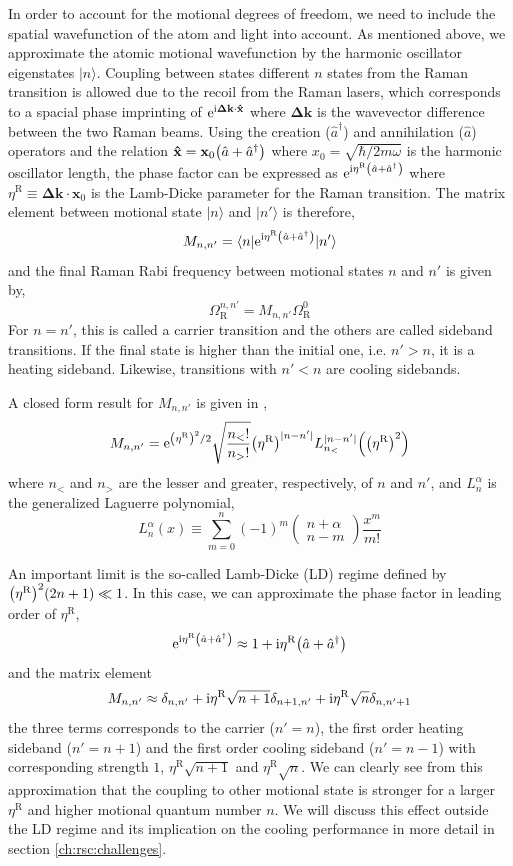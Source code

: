 In order to account for the motional degrees of freedom, we need to include the spatial
wavefunction of the atom and light into account.
As mentioned above, we approximate the atomic motional wavefunction by the harmonic oscillator
eigenstates $|n\rangle$. Coupling between states different $n$ states from the Raman transition
is allowed due to the recoil from the Raman lasers,
which corresponds to a spacial phase imprinting of $\mathrm{e}^{\mathrm{i}\mathbf{\Delta k}\cdot\mathbf{\hat x}}$
where $\mathbf{\Delta k}$ is the wavevector difference between the two Raman beams.
Using the creation ($\hat a^\dagger$) and annihilation ($\hat a$) operators and the relation
$\mathbf{\hat x}=\mathbf{x}_0{\left({\hat a+\hat a^\dagger}\right)}$ where $x_0=\sqrt{\hbar/2m\omega}$
is the harmonic oscillator length, the phase factor can be expressed as
$\mathrm{e}^{\mathrm{i}\eta^{\mathrm{R}}{\left({\hat a+\hat a^\dagger}\right)}}$ where $\eta^{\mathrm{R}}\equiv\mathbf{\Delta k}\cdot\mathbf{x}_0$
is the Lamb-Dicke parameter for the Raman transition.
The matrix element between motional state $|n\rangle$ and $|n'\rangle$ is therefore,
\[ M_{n,n'}=\langle n|\mathrm{e}^{\mathrm{i}\eta^{\mathrm{R}}{\left({\hat a+\hat a^\dagger}\right)}}|n'\rangle \]
and the final Raman Rabi frequency between motional states $n$ and $n'$ is given by,
\[ \Omega_{\mathrm{R}}^{n,n'}=M_{n,n'}\Omega_{\mathrm{R}}^0 \]
For $n=n'$, this is called a carrier transition and the others are called sideband transitions.
If the final state is higher than the initial one, i.e. $n'>n$, it is a heating sideband.
Likewise, transitions with $n'<n$ are cooling sidebands.

A closed form result for $M_{n,n'}$ is given in \cite{wineland_experimental_1998},
\[ M_{n,n'}=\mathrm{e}^{{\left({\eta^{\mathrm{R}}}\right)}^2/2}\sqrt{\frac{n_<!}{n_>!}}{\left({\eta^{\mathrm{R}}}\right)}^{|n-n'|}L_{n_<}^{|n-n'|}{\left({{\left({\eta^{\mathrm{R}}}\right)}^2}\right)} \]
where $n_<$ and $n_>$ are the lesser and greater, respectively, of $n$ and $n'$,
and $L_n^\alpha$ is the generalized Laguerre polynomial,
\[ L_n^\alpha(x)\equiv\sum_{m=0}^n(-1)^m\begin{pmatrix}n+\alpha\\n-m\end{pmatrix}\frac{x^m}{m!} \]

An important limit is the so-called Lamb-Dicke (LD) regime defined by ${\left({\eta^{\mathrm{R}}}\right)}^2(2n+1)\ll 1$.
In this case, we can approximate the phase factor in leading order of $\eta^{\mathrm{R}}$,
\[ \mathrm{e}^{\mathrm{i}\eta^{\mathrm{R}}{\left({\hat a+\hat a^\dagger}\right)}}\approx1+\mathrm{i}\eta^{\mathrm{R}}{\left({\hat a+\hat a^\dagger}\right)} \]
and the matrix element
\[ M_{n,n'}\approx\delta_{n,n'}+\mathrm{i}\eta^{\mathrm{R}}\sqrt{n+1}\delta_{n+1,n'}+\mathrm{i}\eta^{\mathrm{R}}\sqrt{n}\delta_{n,n'+1} \]
the three terms corresponds to the carrier ($n'=n$),
the first order heating sideband ($n'=n+1$)
and the first order cooling sideband ($n'=n-1$) with corresponding strength
$1$, $\eta^{\mathrm{R}}\sqrt{n+1}$ and $\eta^{\mathrm{R}}\sqrt{n}$.
We can clearly see from this approximation that the coupling to other motional state
is stronger for a larger $\eta^{\mathrm{R}}$ and higher motional quantum number $n$.
We will discuss this effect outside the LD regime and its implication
on the cooling performance in more detail in section \ref{ch:rsc:challenges}.

